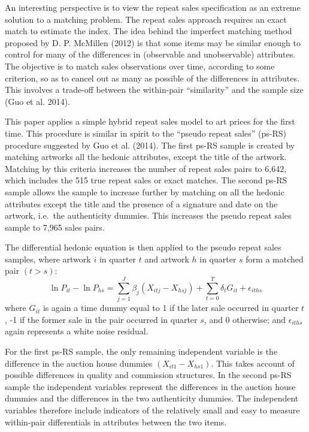 \documentclass[]{elsarticle} %
\begin{document}
An interesting perspective is to view the repeat sales specification as
an extreme solution to a matching problem. The repeat sales approach
requires an exact match to estimate the index. The idea behind the
imperfect matching method proposed by D. P. McMillen (2012) is that some
items may be similar enough to control for many of the differences in
(observable and unobservable) attributes. The objective is to match
sales observations over time, according to some criterion, so as to
cancel out as many as possible of the differences in attributes. This
involves a trade-off between the within-pair ``similarity'' and the
sample size (Guo et al. 2014).

This paper applies a simple hybrid repeat sales model to art prices for
the first time. This procedure is similar in spirit to the ``pseudo
repeat sales'' (ps-RS) procedure suggested by Guo et al. (2014). The
first ps-RS sample is created by matching artworks all the hedonic
attributes, except the title of the artwork. Matching by this criteria
increases the number of repeat sales pairs to 6,642, which includes the
515 true repeat sales or exact matches. The second ps-RS sample allows
the sample to increase further by matching on all the hedonic attributes
except the title and the presence of a signature and date on the
artwork, i.e.~the authenticity dummies. This increases the pseudo repeat
sales sample to 7,965 sales pairs.

The differential hedonic equation is then applied to the pseudo repeat
sales samples, where artwork \(i\) in quarter \(t\) and artwork \(h\) in
quarter \(s\) form a matched pair \((t>s)\):
\[\ln P_{it} - \ln P_{hs} = \sum_{j=1}^J \beta_j (X_{itj} - X_{hsj}) + \sum_{t=0}^T \delta_t G_{it} + \epsilon_{iths}\]
where \(G_{it}\) is again a time dummy equal to 1 if the later sale
occurred in quarter \(t\), -1 if the former sale in the pair occurred in
quarter \(s\), and 0 otherwise; and \(\epsilon_{iths}\) again represents
a white noise residual.

For the first ps-RS sample, the only remaining independent variable is
the difference in the auction house dummies \((X_{it1} - X_{hs1})\).
This takes account of possible differences in quality and commission
structures. In the second ps-RS sample the independent variables
represent the differences in the auction house dummies and the
differences in the two authenticity dummies. The independent variables
therefore include indicators of the relatively small and easy to measure
within-pair differentials in attributes between the two items.
\end{document}
